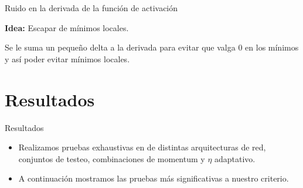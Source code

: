 \documentclass{beamer}
\begin{document}
\begin{frame}{Ruido en la derivada de la función de activación}
\par \textbf{Idea:} Escapar de mínimos locales.\\
\par Se le suma un pequeño delta a la derivada para evitar que valga 0 en los mínimos y así poder evitar mínimos locales.
\end{frame}

\section{Resultados}

\begin{frame}{Resultados}
\begin{itemize}
\item Realizamos pruebas exhaustivas en de distintas arquitecturas de red, conjuntos de testeo, combinaciones de momentum y $\eta$ adaptativo. 
\item A continuación mostramos las pruebas más significativas a nuestro criterio.
\end{itemize}
\end{frame}
\end{document}
